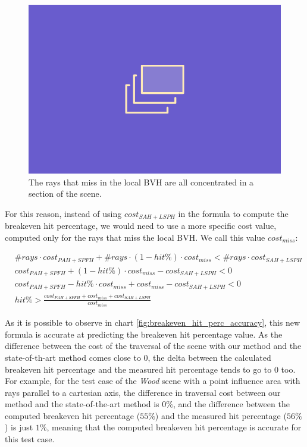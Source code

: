 \documentclass{PoliMi_MasterThesis}
\begin{document}
\begin{figure}[H] 
	\includegraphics[width=\textwidth]{Images/TODO.png}
	\caption{The rays that miss in the local BVH are all concentrated in a section of the scene.}
	\label{fig:ray_missin_local}
\end{figure}

For this reason, instead of using $cost_{SAH+LSPH}$ in the formula to compute the breakeven hit percentage, we would need to use a more specific cost value, computed only for the rays that miss the local BVH. We call this value $cost_{miss}$:

\begin{subequations}
	\begin{align*}
		&\#rays \cdot cost_{PAH+SPFH} + \#rays \cdot (1-hit\%) \cdot cost_{miss} < \#rays \cdot cost_{SAH+LSPH}\\
		&cost_{PAH+SPFH} + (1-hit\%) \cdot cost_{miss} - cost_{SAH+LSPH} < 0\\
		&cost_{PAH+SPFH} - hit\% \cdot cost_{miss} + cost_{miss} - cost_{SAH+LSPH} < 0\\
		&hit\% > \frac{cost_{PAH+SPFH} + cost_{miss} + cost_{SAH+LSPH}}{cost_{miss}}
	\end{align*}
\end{subequations}

As it is possible to observe in chart \ref{fig:breakeven_hit_perc_accuracy}, this new formula is accurate at predicting the breakeven hit percentage value. As the difference between the cost of the traversal of the scene with our method and the state-of-th-art method comes close to 0, the delta between the calculated breakeven hit percentage and the measured hit percentage tends to go to 0 too. For example, for the test case of the \textit{Wood} scene with a point influence area with rays parallel to a cartesian axis, the difference in traversal cost between our method and the state-of-the-art method is $0\%$, and the difference between the computed breakeven hit percentage ($55\%$) and the measured hit percentage ($56\%$) is just $1\%$, meaning that the computed breakeven hit percentage is accurate for this test case.
\end{document}

